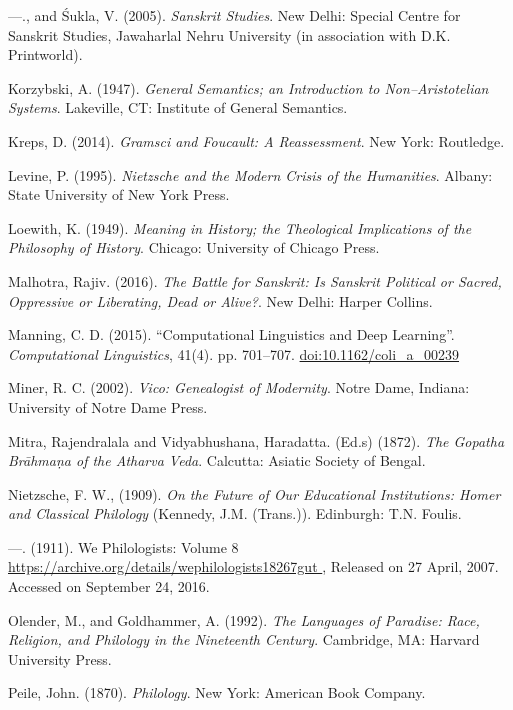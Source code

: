 \begin{thebibliography}{99}
  —., and Śukla, V. (2005). \textit{Sanskrit Studies}. New Delhi: Special Centre for Sanskrit Studies, Jawaharlal Nehru University (in association with D.K. Printworld).

  Korzybski, A. (1947). \textit{General Semantics; an Introduction to Non–Aristotelian Systems}. Lakeville, CT: Institute of General Semantics.

  Kreps, D. (2014). \textit{Gramsci and Foucault: A Reassessment}. New York: Routledge.

  Levine, P. (1995). \textit{Nietzsche and the Modern Crisis of the Humanities}. Albany: State University of New York Press.

  Loewith, K. (1949). \textit{Meaning in History; the Theological Implications of the Philosophy of History}. Chicago: University of Chicago Press.

  Malhotra, Rajiv. (2016). \textit{The Battle for Sanskrit: Is Sanskrit Political or Sacred, Oppressive or Liberating, Dead or Alive?}. New Delhi: Harper Collins.

  Manning, C. D. (2015). “Computational Linguistics and Deep Learning”. \textit{Computational Linguistics}, 41(4). pp. 701–707. \url{doi:10.1162/coli_a_00239}

  Miner, R. C. (2002). \textit{Vico: Genealogist of Modernity}. Notre Dame, Indiana: University of Notre Dame Press.

  Mitra, Rajendralala and Vidyabhushana, Haradatta. (Ed.s) (1872). \textit{The Gopatha Brāhmaṇa of the Atharva Veda}. Calcutta: Asiatic Society of Bengal.

  Nietzsche, F. W., (1909). \textit{On the Future of Our Educational Institutions: Homer and Classical Philology} (Kennedy, J.M. (Trans.)). Edinburgh: T.N. Foulis.

  —. (1911). We Philologists: Volume 8 \url{ https://archive.org/details/wephilologists18267gut }, Released on 27 April, 2007. Accessed on September 24, 2016.

  Olender, M., and Goldhammer, A. (1992). \textit{The Languages of Paradise: Race, Religion, and Philology in the Nineteenth Century}. Cambridge, MA: Harvard University Press.

  Peile, John. (1870). \textit{Philology}. New York: American Book Company.


\end{thebibliography}
